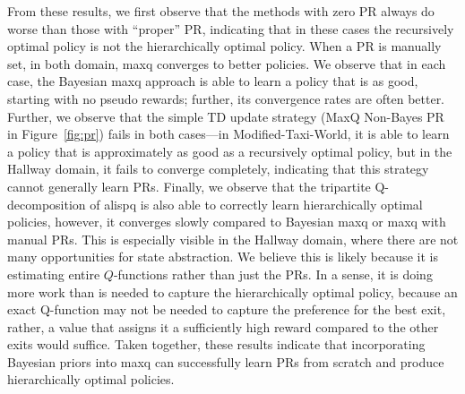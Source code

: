 From these results, we first observe that the methods with zero
PR always do worse than those with ``proper''
PR, indicating that in these cases the recursively optimal
policy is not the hierarchically optimal policy. When a PR
is manually set, in both domain, {\sc maxq} converges to better
policies. We observe that in each case, the Bayesian {\sc maxq}
approach is able to learn a policy that is as good, starting with no
pseudo rewards; further, its convergence rates are often
better. Further, we observe that the simple TD update strategy (MaxQ
Non-Bayes PR in Figure~\ref{fig:pr}) fails in both cases---in {\sf
Modified-Taxi-World}, it is able to learn a policy that is
approximately as good as a recursively optimal policy, but in the {\sf
Hallway} domain, it fails to converge completely, indicating that this
strategy cannot generally learn PRs. Finally, we observe
that the tripartite Q-decomposition of {\sc alispq} is also able to
correctly learn hierarchically optimal policies, however, it converges
slowly compared to Bayesian {\sc maxq} or {\sc maxq} with manual
PRs. This is especially visible in the {\sf Hallway}
domain, where there are not many opportunities for state
abstraction. We believe this is likely because it is estimating entire
$Q$-functions rather than just the PRs. In a sense, it is doing
more work than is needed to capture the hierarchically optimal policy,
because an exact Q-function may not be needed to capture the
preference for the best exit, rather, a value that assigns it a
sufficiently high reward compared to the other exits would
suffice. Taken together, these results indicate that incorporating
Bayesian priors into {\sc maxq} can successfully learn PRs
from scratch and produce hierarchically optimal policies.

